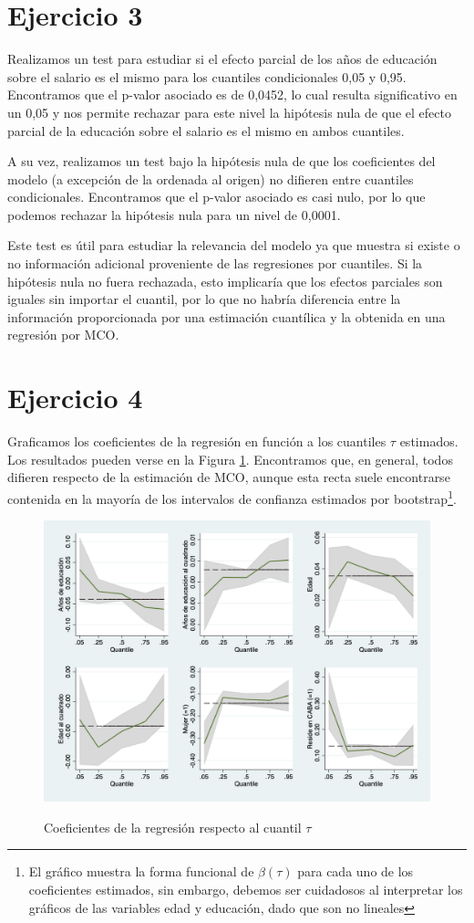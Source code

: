 \documentclass[11pt]{article}
\begin{document}
\section*{Ejercicio 3}

Realizamos un test para estudiar si el efecto parcial de los años de educación sobre el salario es el mismo para los cuantiles condicionales 0,05 y 0,95. Encontramos que el p-valor asociado es de 0,0452, lo cual resulta significativo en un 0,05 y nos permite rechazar para este nivel la hipótesis nula de que el efecto parcial de la educación sobre el salario es el mismo en ambos cuantiles.

A su vez, realizamos un test bajo la hipótesis nula de que los coeficientes del modelo (a excepción de la ordenada al origen) no difieren entre cuantiles condicionales. Encontramos que el p-valor asociado es casi nulo, por lo que podemos rechazar la hipótesis nula para un nivel de 0,0001. 

Este test es útil para estudiar la relevancia del modelo ya que muestra si existe o no información adicional proveniente de las regresiones por cuantiles. Si la hipótesis nula no fuera rechazada, esto implicaría que los efectos parciales son iguales sin importar el cuantil, por lo que no habría diferencia entre la información proporcionada por una estimación cuantílica y la obtenida en una regresión por MCO.

\section*{Ejercicio 4}

Graficamos los coeficientes de la regresión en función a los cuantiles $\tau$ estimados. Los resultados pueden verse en la Figura \ref{fig: 4}. Encontramos que, en general, todos difieren respecto de la estimación de MCO, aunque esta recta suele encontrarse contenida en la mayoría de los intervalos de confianza estimados por bootstrap\footnote{El gráfico muestra la forma funcional de $\beta(\tau)$ para cada uno de los coeficientes estimados, sin embargo, debemos ser cuidadosos al interpretar los gráficos de las variables edad y educación, dado que son no lineales}.  

\begin{figure}[H]
	\caption{Coeficientes de la regresión respecto al cuantil $\tau$}
	\centering
	\includegraphics[width=0.8\linewidth]{4.png}
	\label{fig: 4}
\end{figure}
\end{document}
